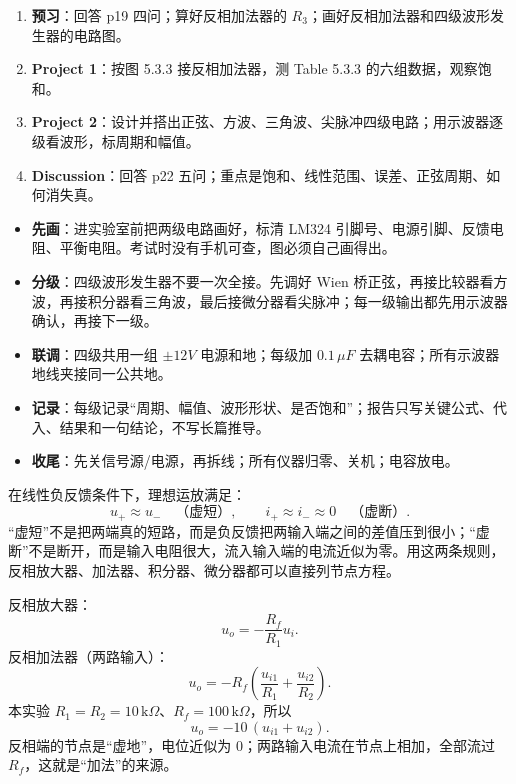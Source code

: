 \documentclass[11pt]{ctexart}
\let\orighdr\hdr
\renewcommand{\hdr}[2]{\needspace{12\baselineskip}\orighdr{#1}{#2}}
\let\origsubhdr\subhdr
\renewcommand{\subhdr}[1]{\needspace{3\baselineskip}\origsubhdr{#1}}
\begin{document}
\begin{enumerate}
  \item \textbf{预习}：回答 p19 四问；算好反相加法器的 \(R_3\)；画好反相加法器和四级波形发生器的电路图。
  \item \textbf{Project 1}：按图 5.3.3 接反相加法器，测 Table 5.3.3 的六组数据，观察饱和。
  \item \textbf{Project 2}：设计并搭出正弦、方波、三角波、尖脉冲四级电路；用示波器逐级看波形，标周期和幅值。
  \item \textbf{Discussion}：回答 p22 五问；重点是饱和、线性范围、误差、正弦周期、如何消失真。
\end{enumerate}


\begin{itemize}
  \item \textbf{先画}：进实验室前把两级电路画好，标清 LM324 引脚号、电源引脚、反馈电阻、平衡电阻。考试时没有手机可查，图必须自己画得出。
  \item \textbf{分级}：四级波形发生器不要一次全接。先调好 Wien 桥正弦，再接比较器看方波，再接积分器看三角波，最后接微分器看尖脉冲；每一级输出都先用示波器确认，再接下一级。
  \item \textbf{联调}：四级共用一组 \(\pm12V\) 电源和地；每级加 \(0.1\,\mu F\) 去耦电容；所有示波器地线夹接同一公共地。
  \item \textbf{记录}：每级记录“周期、幅值、波形形状、是否饱和”；报告只写关键公式、代入、结果和一句结论，不写长篇推导。
  \item \textbf{收尾}：先关信号源/电源，再拆线；所有仪器归零、关机；电容放电。
\end{itemize}



在线性负反馈条件下，理想运放满足：
\[
u_+\approx u_- \quad\text{（虚短）},\qquad i_+\approx i_-\approx0 \quad\text{（虚断）}.
\]
“虚短”不是把两端真的短路，而是负反馈把两输入端之间的差值压到很小；“虚断”不是断开，而是输入电阻很大，流入输入端的电流近似为零。用这两条规则，反相放大器、加法器、积分器、微分器都可以直接列节点方程。


反相放大器：
\[
u_o=-\frac{R_f}{R_1}u_i.
\]
反相加法器（两路输入）：
\[
u_o=-R_f\left(\frac{u_{i1}}{R_1}+\frac{u_{i2}}{R_2}\right).
\]
本实验 \(R_1=R_2=10\,\mathrm{k}\Omega\)、\(R_f=100\,\mathrm{k}\Omega\)，所以
\[
u_o=-10\,(u_{i1}+u_{i2}).
\]
反相端的节点是“虚地”，电位近似为 0；两路输入电流在节点上相加，全部流过 \(R_f\)，这就是“加法”的来源。
\end{document}
